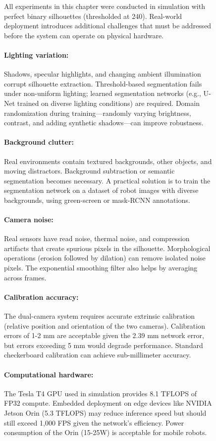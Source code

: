 \documentclass[12pt,a4paper,oneside]{report}
\begin{document}
\begin{figure}[H]
All experiments in this chapter were conducted in simulation with perfect binary silhouettes (thresholded at 240). Real-world deployment introduces additional challenges that must be addressed before the system can operate on physical hardware.

\paragraph{Lighting variation:} Shadows, specular highlights, and changing ambient illumination corrupt silhouette extraction. Threshold-based segmentation fails under non-uniform lighting; learned segmentation networks (e.g., U-Net trained on diverse lighting conditions) are required. Domain randomization during training---randomly varying brightness, contrast, and adding synthetic shadows---can improve robustness.

\paragraph{Background clutter:} Real environments contain textured backgrounds, other objects, and moving distractors. Background subtraction or semantic segmentation becomes necessary. A practical solution is to train the segmentation network on a dataset of robot images with diverse backgrounds, using green-screen or mask-RCNN annotations.

\paragraph{Camera noise:} Real sensors have read noise, thermal noise, and compression artifacts that create spurious pixels in the silhouette. Morphological operations (erosion followed by dilation) can remove isolated noise pixels. The exponential smoothing filter also helps by averaging across frames.

\paragraph{Calibration accuracy:} The dual-camera system requires accurate extrinsic calibration (relative position and orientation of the two cameras). Calibration errors of 1-2 mm are acceptable given the 2.39 mm network error, but errors exceeding 5 mm would degrade performance. Standard checkerboard calibration can achieve sub-millimeter accuracy.

\paragraph{Computational hardware:} The Tesla T4 GPU used in simulation provides 8.1 TFLOPS of FP32 compute. Embedded deployment on edge devices like NVIDIA Jetson Orin (5.3 TFLOPS) may reduce inference speed but should still exceed 1,000 FPS given the network's efficiency. Power consumption of the Orin (15-25W) is acceptable for mobile robots.


\end{figure}
\end{document}
